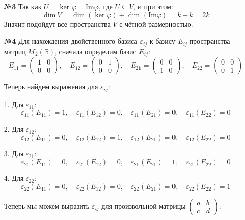 \documentclass[a4paper]{article}
\renewcommand{\phi}{\varphi}
\begin{document}
\begin{enumerate}
    \item[\textbf{№3}]Так как $U = \ker \phi = \text{Im} \phi$, где $U \subseteq V$, и при этом:
    $$\dim V = \dim (\ker \phi) + \dim ( \text{Im} \phi) = k+k = 2k$$
    Значит подойдут все пространства $V$ с чётной размерностью.\\

    \item[\textbf{№4}]Для нахождения двойственного базиса $\varepsilon_{ij}$ к базису $E_{ij}$ пространства матриц $M_{2}(\mathbb{R})$, сначала определим базис $E_{ij}$:
    $$
    E_{11} = \begin{pmatrix} 1 & 0 \\ 0 & 0 \end{pmatrix}, \quad E_{12} = \begin{pmatrix} 0 & 1 \\ 0 & 0 \end{pmatrix}, \quad E_{21} = \begin{pmatrix} 0 & 0 \\ 1 & 0 \end{pmatrix}, \quad E_{22} = \begin{pmatrix} 0 & 0 \\ 0 & 1 \end{pmatrix}
    $$
        
    Теперь найдем выражения для $\varepsilon_{ij}$:

    1. Для $\varepsilon_{11}$:
    $$
    \varepsilon_{11}(E_{11}) = 1, \quad \varepsilon_{11}(E_{12}) = 0, \quad \varepsilon_{11}(E_{21}) = 0, \quad \varepsilon_{11}(E_{22}) = 0
    $$

    2. Для $\varepsilon_{12}$:
    $$
    \varepsilon_{12}(E_{11}) = 0, \quad \varepsilon_{12}(E_{12}) = 1, \quad \varepsilon_{12}(E_{21}) = 0, \quad \varepsilon_{12}(E_{22}) = 0
    $$

    3. Для $\varepsilon_{21}$:
    $$
    \varepsilon_{21}(E_{11}) = 0, \quad \varepsilon_{21}(E_{12}) = 0, \quad \varepsilon_{21}(E_{21}) = 1, \quad \varepsilon_{21}(E_{22}) = 0
    $$

    4. Для $\varepsilon_{22}$:
    $$
    \varepsilon_{22}(E_{11}) = 0, \quad \varepsilon_{22}(E_{12}) = 0, \quad \varepsilon_{22}(E_{21}) = 0, \quad \varepsilon_{22}(E_{22}) = 1
    $$

    Теперь мы можем выразить $\varepsilon_{ij}$ для произвольной матрицы $\begin{pmatrix} a & b \\ c & d \end{pmatrix}$:
    

\end{enumerate}
\end{document}
